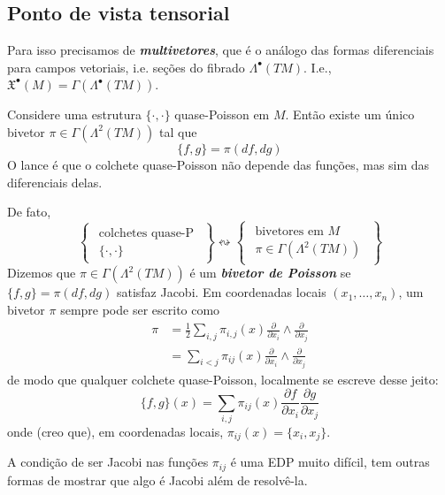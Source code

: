 \subsection{Ponto de vista tensorial}

Para isso precisamos de \textit{\textbf{multivetores}}, que é o análogo das formas diferenciais para campos vetoriais, i.e. seções do fibrado \(\Lambda^{\bullet}(TM)\). I.e., \(\mathfrak{X}^\bullet(M)=\Gamma(\Lambda^{\bullet}(TM))\).

Considere uma estrutura \(\{\cdot ,\cdot \}\) quase-Poisson em \(M\). Então existe um único bivetor \(\pi \in \Gamma(\Lambda^{2}(TM))\) tal que
\[\{f,g\}=\pi(df,dg)\]
O lance é que o colchete quase-Poisson não depende das funções, mas sim das diferenciais delas.

De fato,
\[\left\{ \substack{\begin{array}{c}\text{colchetes quase-P}  \\ \{\cdot ,\cdot \}\end{array}} \right\} \leftrightsquigarrow \left\{ \substack{\begin{array}{c}\text{bivetores em \(M\)}  \\ \pi \in \Gamma(\Lambda^{2}(TM))\end{array}}\right\} \]
Dizemos que \(\pi \in \Gamma(\Lambda^{2}(TM))\) é um \textit{\textbf{bivetor de Poisson}} se \(\{f,g\}=\pi(df,dg)\) satisfaz Jacobi. Em coordenadas locais \((x_1,\ldots,x_n)\), um bivetor \(\pi\) sempre pode ser escrito como
\begin{align*}
\pi&=\frac{1}{2}\sum_{i,j}\pi_{i,j}(x) \frac{\partial }{\partial x_i}\wedge \frac{\partial }{\partial x_j}\\
&=\sum_{i<j}\pi_{ij}(x)\frac{\partial }{\partial x_i}\wedge\frac{\partial }{\partial x_j}
\end{align*}
de modo que qualquer colchete quase-Poisson, localmente se escreve desse jeito:
\[\{f,g\}(x)=\sum_{i,j}\pi_{ij}(x)\frac{\partial f}{\partial x_i}\frac{\partial g}{\partial x_j}\]
onde (creo que), em coordenadas locais, \(\pi_{ij}(x)=\{x_i,x_j\}\).
\begin{remark}\leavevmode
	A condição de ser Jacobi nas funções \(\pi_{ij}\) é uma EDP muito difícil, tem outras formas de mostrar que algo é Jacobi além de resolvê-la.
\end{remark}

